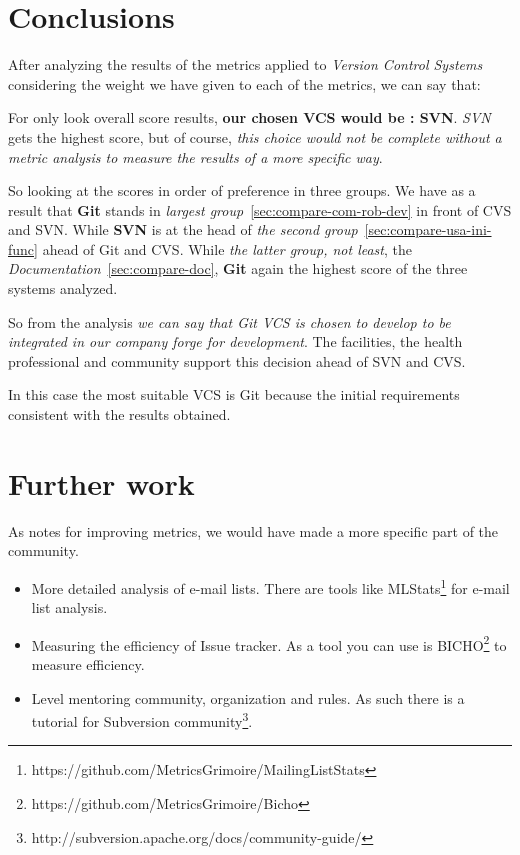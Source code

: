 \documentclass[11pt]{scrartcl}
\begin{document}
\section{Conclusions}

\par After analyzing the results of the metrics applied to \emph{Version Control Systems} considering the weight we have given to each of the metrics, we can say that:

\par For only look overall score results, \textbf{our chosen VCS would be : SVN}. \emph{SVN} gets the highest score, but of course, \emph{this choice would not be complete without a metric analysis to measure the results of a more specific way}.

\par So looking at the scores in order of preference in three groups. We have as a result that \textbf{Git} stands in \emph{largest group}~\ref{sec:compare-com-rob-dev} in front of CVS and SVN. While \textbf{SVN} is at the head of \emph{the second group}~\ref{sec:compare-usa-ini-func} ahead of Git and CVS. While \emph{the latter group, not least}, the \emph{Documentation}~\ref{sec:compare-doc}, \textbf{Git} again the highest score of the three systems analyzed.

\par So from the analysis \emph{we can say that \emph{Git} VCS is chosen to develop to be integrated in our company forge for development}. The facilities, the health professional and community support this decision ahead of SVN and CVS.

\par In this case the most suitable VCS is Git because the initial requirements consistent with the results obtained.

\section{Further work}

\par As notes for improving metrics, we would have made a more specific part of the community.

\begin{itemize}

    \item More detailed analysis of e-mail lists. There are tools like MLStats\footnote{https://github.com/MetricsGrimoire/MailingListStats} for e-mail list analysis.

    \item Measuring the efficiency of Issue tracker. As a tool you can use is BICHO\footnote{https://github.com/MetricsGrimoire/Bicho} to measure efficiency.

    \item Level mentoring community, organization and rules. As such there is a tutorial for Subversion community\footnote{http://subversion.apache.org/docs/community-guide/}.

\end{itemize}
\end{document}
